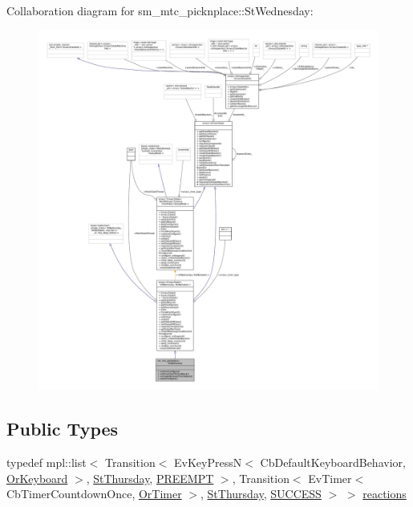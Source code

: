 Collaboration diagram for sm\+\_\+mtc\+\_\+picknplace\+:\+:St\+Wednesday\+:
\nopagebreak
\begin{figure}[H]
\begin{center}
\leavevmode
\includegraphics[width=350pt]{structsm__mtc__picknplace_1_1StWednesday__coll__graph}
\end{center}
\end{figure}
\subsection*{Public Types}
\begin{DoxyCompactItemize}
\item 
typedef mpl\+::list$<$ Transition$<$ Ev\+Key\+PressN$<$ Cb\+Default\+Keyboard\+Behavior, \hyperlink{classsm__mtc__picknplace_1_1OrKeyboard}{Or\+Keyboard} $>$, \hyperlink{structsm__mtc__picknplace_1_1StThursday}{St\+Thursday}, \hyperlink{classPREEMPT}{P\+R\+E\+E\+M\+PT} $>$, Transition$<$ Ev\+Timer$<$ Cb\+Timer\+Countdown\+Once, \hyperlink{classsm__mtc__picknplace_1_1OrTimer}{Or\+Timer} $>$, \hyperlink{structsm__mtc__picknplace_1_1StThursday}{St\+Thursday}, \hyperlink{classSUCCESS}{S\+U\+C\+C\+E\+SS} $>$ $>$ \hyperlink{structsm__mtc__picknplace_1_1StWednesday_ad46b9202ae7fd4e050d6dfc3452d3119}{reactions}
\end{DoxyCompactItemize}
